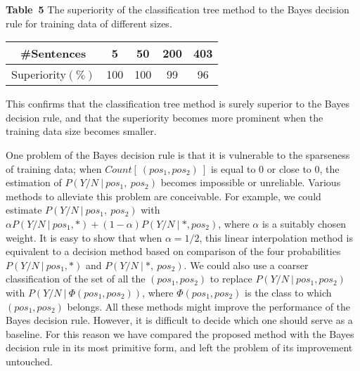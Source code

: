 \begin{table}[b]
\begin{center}
{\bf Table\ 5} The superiority of the classification tree method to
the Bayes decision rule for  training  data of different sizes.
\vspace{15pt}\\
\begin{tabular}{c|c|c|c|c}
\#Sentences&5&50&200&403\\ \hline
Superiority$(\%)$& 100 & 100 & 99 & 96
\end{tabular}
\end{center}
\end{table}

This confirms that the
classification tree
method is surely superior to the Bayes decision rule, and that the
superiority becomes more prominent when the training data size becomes smaller.

One problem of the Bayes decision rule is that it is vulnerable to 
the sparseness of training data; when $Count[\ (pos_1,pos_2)\ ]$
is equal to 0 or close to 0,  the estimation of $P(Y/N\ |\ pos_1,\
pos_2)$  becomes impossible or unreliable.  
Various methods  to alleviate this problem are conceivable. For example,  
we could  estimate  $P(Y/N\ |\ pos_1,\ pos_2)$ with 
$\alpha P(Y/N\ |\ pos_1,*) + (1- \alpha ) P(Y/N\ |\ *, pos_2)$, where $\alpha$
is  a suitably
chosen weight. It is easy to show that when $\alpha =1/2$, 
 this linear interpolation  method is equivalent to a decision method
based on comparison of the four probabilities
$P(Y/N\ |\ pos_1,*)$ and $P(Y/N\ |\ *,\ pos_2)$.
We could also use a coarser
classification of the set of all the $(pos_1,pos_2)$ to replace
$P(Y/N\ |\ pos_1,pos_2)$ with  $P(Y/N\ |\ \Phi(pos_1,pos_2))$, where
$\Phi(pos_1,pos_2)$ is the
class to which $(pos_1,pos_2)$ belongs. 
All these methods might improve the performance of the Bayes
decision rule.
However, it is difficult to 
decide which one   should serve as a baseline.
For this reason we have compared the proposed method with the Bayes
decision
rule in its most primitive form, and left the problem of its
improvement untouched.


